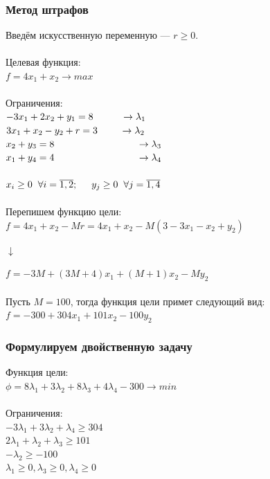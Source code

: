 \documentclass[14pt,a4paper,fleqn]{extarticle}
\begin{document}
\subsubsection*{Метод штрафов}
Введём искусственную переменную --- $r \geq 0$.\\\\
Целевая функция:\\
$f = 4x_1+x_2 \longrightarrow max$\\\\
Ограничения:\\
$-3x_1 + 2x_2 + y_1 = 8 \hspace*{1cm} \rightarrow \lambda_1$\\
$3x_1 + x_2 - y_2 + r = 3 \hspace*{0.8cm} \rightarrow \lambda_2$\\
$x_2 + y_3 = 8 \hspace*{3cm} \rightarrow \lambda_3$\\
$x_1 + y_4 = 4 \hspace*{3cm} \rightarrow \lambda_4$\\\\
$x_i \geq 0 \hspace{0.2cm} \forall i = \overline{1,2}; \hspace{0.5cm} y_j \geq 0 \hspace{0.2cm} \forall j =  \overline{1,4}$\\\\
Перепишем функцию цели:\\
$f = 4x_1 + x_2 - Mr = 4x_1 + x_2 - M(3 - 3x_1 - x_2 + y_2)$
\begin{center}$\downarrow$\end{center}
$f = -3M + (3M + 4)x_1 + (M + 1)x_2 - My_2$\\\\
Пусть $M = 100$, тогда функция цели примет следующий вид:\\
$f = -300 + 304x_1 + 101x_2 - 100y_2$
\subsubsection*{Формулируем двойственную задачу}
Функция цели:\\
$\phi = 8\lambda_1 + 3\lambda_2 + 8\lambda_3 + 4\lambda_4 - 300 \longrightarrow min$\\\\
Ограничения:\\
$-3\lambda_1 + 3\lambda_2 + \lambda_4 \geq 304$\\
$2\lambda_1 + \lambda_2 + \lambda_3 \geq 101$\\
$-\lambda_2 \geq -100$\\
$\lambda_1 \geq 0, \lambda_3 \geq 0, \lambda_4 \geq 0$\\
\noindent\makebox[\linewidth]{\rule{\paperwidth}{0.4pt}}\\
\newpage
\end{document}
